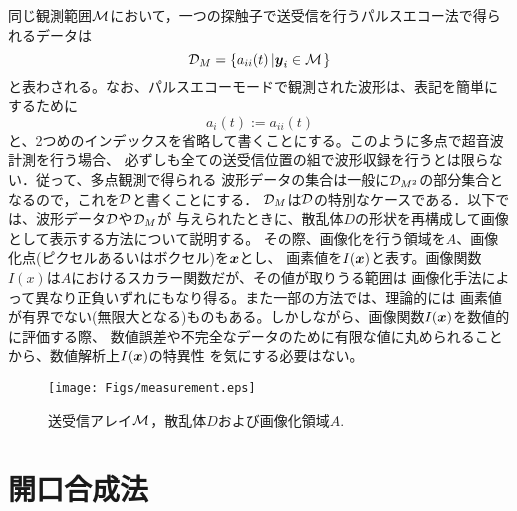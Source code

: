 \documentclass[10pt,a4j,dvipdfmx]{jarticle}
\begin{document}
同じ観測範囲$\cal M$において，一つの探触子で送受信を行うパルスエコー法で得られるデータは
\begin{equation}
	{\cal D}_{M}= \left\{ a_{ii}(t) \left| \mbox{\boldmath $y$}_i \in {\cal M}\right.\right\}
	\label{eqn:pulse_echo}
\end{equation}
と表わされる。なお、パルスエコーモードで観測された波形は、表記を簡単にするために
\begin{equation}
	a_i(t):=a_{ii}(t)
	\label{eqn:}
\end{equation}
と、2つめのインデックスを省略して書くことにする。このように多点で超音波計測を行う場合、
必ずしも全ての送受信位置の組で波形収録を行うとは限らない．従って、多点観測で得られる
波形データの集合は一般に${\cal D}_{M^2}$の部分集合となるので，これを$\cal D$と書くことにする．
${\cal D}_M$は$\cal D$の特別なケースである．以下では、波形データ$\cal D$や${\cal D}_M$が
与えられたときに、散乱体$D$の形状を再構成して画像として表示する方法について説明する。
その際、画像化を行う領域を$A$、画像化点(ピクセルあるいはボクセル)を$\mbox{\boldmath $x$}$とし、
画素値を$I(\mbox{\boldmath $x$})$と表す。画像関数$I(x)$は$A$におけるスカラー関数だが、その値が取りうる範囲は
画像化手法によって異なり正負いずれにもなり得る。また一部の方法では、理論的には
画素値が有界でない(無限大となる)ものもある。しかしながら、画像関数$I(\mbox{\boldmath $x$})$を数値的に評価する際、
数値誤差や不完全なデータのために有限な値に丸められることから、数値解析上$I(\mbox{\boldmath $x$})$の特異性
を気にする必要はない。
\begin{figure}[h]
	\begin{center}
	\texttt{[image: Figs/measurement.eps]} 
	\end{center}
	\caption{送受信アレイ$\cal M$，散乱体$D$および画像化領域$A$.} 
	\label{fig:arrayM}
\end{figure}
%
\section{開口合成法}
\end{document}
